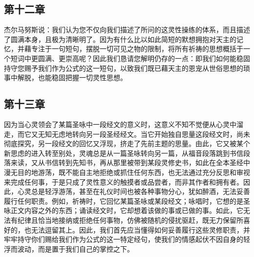 
\subsection{第十二章}

\par

杰尔马努斯说：我们认为您不仅向我们描述了所问的这灵性操练的体系，而且描述了圆满本身，且极为清晰明了。因为有什么比以如此简短的默想拥抱对天主的记忆，并藉专注于一句短句，摆脱一切可见之物的限制，将所有祈祷的思想概括于一个短词中更圆满、更崇高呢？因此我们恳请您解明仍存的一点：即我们如何能稳固持守您赐予我们作为公式的这一短句，以致我们既已藉天主的恩宠从世俗思想的琐事中解脱，也能稳固把握一切灵性思想。\par


\subsection{第十三章}

\par

因为当心灵领会了某篇圣咏中一段经文的意义时，这意义不知不觉便从心灵中溜走，而它又无知无虑地转向另一段圣经经文。当它开始独自思量这段经文时，尚未彻底探究，另一段经文的回忆又浮现，挤走了先前主题的思量。由此，它又被某个新思虑的进入转至别处，灵魂总是从一篇圣咏转向另一篇，从福音段落跳到书信段落来读，又从书信转到先知书，再从那里被带到某段灵修史书，如此在全本圣经中漫无目的地游荡，既不能自主地拒绝或抓住任何东西，也无法通过充分反思和审视来完成任何事，于是只成了灵性意义的触摸者或品尝者，而非其作者和拥有者。因此，心灵总是轻浮游荡，甚至在礼仪时间也被各种事物分心，犹如醉酒，无法妥善履行任何职责。例如，祈祷时，它回忆某篇圣咏或某段经文；咏唱时，它想的是圣咏正文内容之外的东西；诵读经文时，它却想着该做的事或已做的事。如此，它无法有纪律且恰当地接纳或拒绝任何事物，仿佛被随机的侵扰驱赶，既无力保留所喜好的，也无法逗留其上。因此，我们首先应当懂得如何妥善履行这些灵修职责，并牢牢持守你们赐给我们作为公式的这一特定经句，使我们的情感起伏不因自身的轻浮而波动，而是置于我们自己的掌控之下。\par


